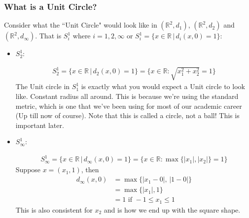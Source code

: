 \documentclass[10pt]{article}
\begin{document}
\subsubsection{What is a Unit Circle?}
Consider what the ``Unit Circle" would look like in $(\mathbb{R}^{2}, d_{1})$, $(\mathbb{R}^{2}, d_{2})$ and $(\mathbb{R}^{2}, d_{\infty})$. That is $S_{i}^{1}$ where $i=1,2,\infty$ or $S_{i}^{1}=\{x\in\mathbb{R}\,|\,d_{i}(x,0)=1\}$:
\begin{itemize}
    \item $S_{2}^{1}$:
    \begin{multicols}{2}

    \begin{align*}
        S_{2}^{1}=\{x\in\mathbb{R}\,|\,d_{2}(x,0)=1\}=\{x\in\mathbb{R}:\sqrt{x_{1}^{2}+x_{2}^{2}}=1\}
    \end{align*}
    The Unit circle in $S_{1}^{1}$ is exactly what you would expect a Unit circle to look like. Constant radius all around. This is because we're using the standard metric, which is one that we've been using for most of our academic career (Up till now of course). Note that this is called a circle, not a ball! This is important later. 
    \end{multicols}

    \item $S_{\infty}^{1}$:
    \begin{multicols}{2}

    \begin{align*}
        S_{\infty}^{1}=\{x\in\mathbb{R}\,|\,d_{\infty}(x,0)=1\}=\{x\in\mathbb{R}:\max\{|x_{1}|,|x_{2}|\}=1\}
    \end{align*}
    Suppose $x=(x_{1},1)$, then 
    \begin{align*}
        d_{\infty}(x,0)&=\max\{|x_{1}-0|,\,|1-0|\}\\
        &=\max\{|x_{1}|,1\}\\
        &=1 \text{ if } -1\leq x_{1}\leq1
    \end{align*}
    This is also consistent for $x_{2}$ and is how we end up with the square shape.
    \end{multicols}
    

\end{itemize}
\end{document}
